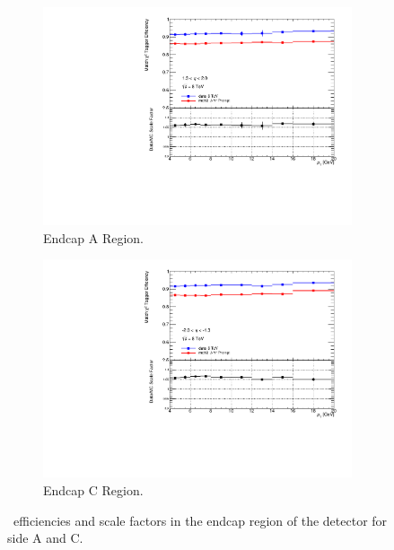 \begin{figure}[htbp]
  \centering
  \begin{subfigure}[b]{0.85\textwidth}
    \includegraphics[width=\textwidth]{PartCalibration2012/Plots/SFPlots/Endcap_A_smt.pdf}
    \caption{Endcap A Region.} \label{fig:CalibrationScaleFactorEndcapA}
  \end{subfigure}
  
  \begin{subfigure}[b]{0.85\textwidth}
    \includegraphics[width=\textwidth]{PartCalibration2012/Plots/SFPlots/Endcap_C_smt.pdf}
    \caption{Endcap C Region.} \label{fig:CalibrationScaleFactorEndcapC}
  \end{subfigure}
  \caption{\xsm\ efficiencies and scale factors in the endcap region of the detector for side  A and  C.} \label{fig:CalibrationScaleFactorEndcap}
\end{figure}

